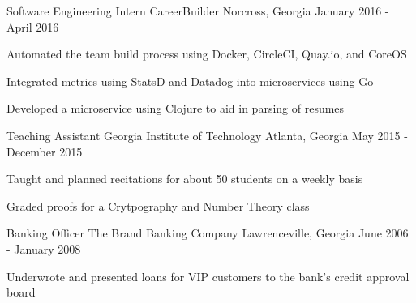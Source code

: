\begin{cventries}
  \cventry
    {Software Engineering Intern} %
    {CareerBuilder} %
    {Norcross, Georgia} %
    {January 2016 - April 2016} %
    {
      \begin{cvitems} %
        \item {Automated the team build process using Docker, CircleCI, Quay.io, and CoreOS}
        \item {Integrated metrics using StatsD and Datadog into microservices using Go}
        \item {Developed a microservice using Clojure to aid in parsing of resumes}
      \end{cvitems}
    }

  \cventry
    {Teaching Assistant} %
    {Georgia Institute of Technology} %
    {Atlanta, Georgia} %
    {May 2015 - December 2015} %
    {
      \begin{cvitems} %
        \item {Taught and planned recitations for about 50 students on a weekly basis}
        \item{Graded proofs for a Crytpography and Number Theory class}
      \end{cvitems}
    }

  \cventry
    {Banking Officer} %
    {The Brand Banking Company} %
    {Lawrenceville, Georgia} %
    {June 2006 - January 2008} %
    {\begin{cvitems} %
      \item {Underwrote and presented loans for VIP customers to the bank's credit approval board}
    \end{cvitems}}

\end{cventries}
